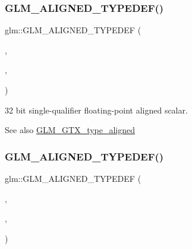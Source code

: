 \subsubsection{\texorpdfstring{G\+L\+M\+\_\+\+A\+L\+I\+G\+N\+E\+D\+\_\+\+T\+Y\+P\+E\+D\+E\+F()}{GLM\_ALIGNED\_TYPEDEF()}\hspace{0.1cm}{\footnotesize\ttfamily [138/209]}}
{\footnotesize\ttfamily glm\+::\+G\+L\+M\+\_\+\+A\+L\+I\+G\+N\+E\+D\+\_\+\+T\+Y\+P\+E\+D\+EF (\begin{DoxyParamCaption}\item[{\mbox{\hyperlink{group__gtc__type__precision_ga642737ae3e7c434b366f2191e6944bf2}{float32\+\_\+t}}}]{,  }\item[{aligned\+\_\+float32\+\_\+t}]{,  }\item[{4}]{ }\end{DoxyParamCaption})}

32 bit single-\/qualifier floating-\/point aligned scalar. \begin{DoxySeeAlso}{See also}
\mbox{\hyperlink{group__gtx__type__aligned}{G\+L\+M\+\_\+\+G\+T\+X\+\_\+type\+\_\+aligned}} 
\end{DoxySeeAlso}
\mbox{\label{group__gtx__type__aligned_gadbce23b9f23d77bb3884e289a574ebd5}} 
\subsubsection{\texorpdfstring{G\+L\+M\+\_\+\+A\+L\+I\+G\+N\+E\+D\+\_\+\+T\+Y\+P\+E\+D\+E\+F()}{GLM\_ALIGNED\_TYPEDEF()}\hspace{0.1cm}{\footnotesize\ttfamily [139/209]}}
{\footnotesize\ttfamily glm\+::\+G\+L\+M\+\_\+\+A\+L\+I\+G\+N\+E\+D\+\_\+\+T\+Y\+P\+E\+D\+EF (\begin{DoxyParamCaption}\item[{\mbox{\hyperlink{group__gtc__type__precision_ga814f2f65354b6588b067cc5c67a6b340}{float32}}}]{,  }\item[{aligned\+\_\+f32}]{,  }\item[{4}]{ }\end{DoxyParamCaption})}

